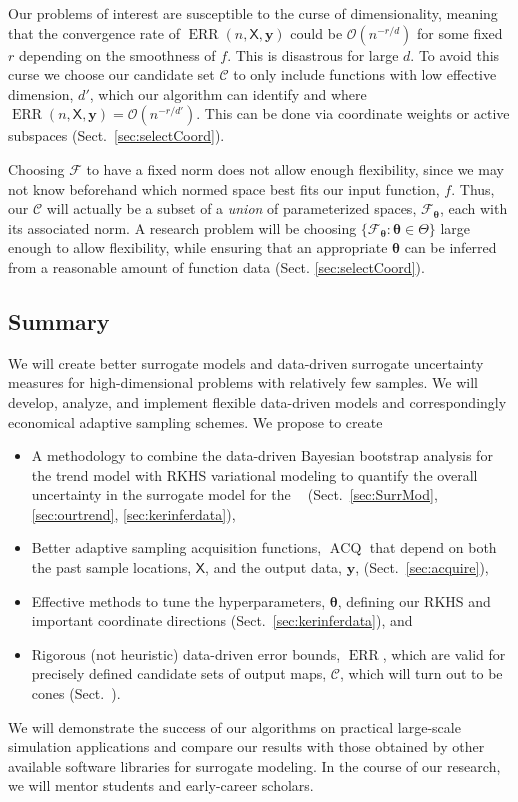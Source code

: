 \documentclass[11pt]{NSFamsart}
\DeclareMathOperator{\QOI}{QOI} %
\DeclareMathOperator{\APP}{\widehat{\QOI}}
\DeclareMathOperator{\ERR}{ERR}
\DeclareMathOperator{\VAL}{ACQ}
\newcommand{\mX}{\mathsf{X}}
\newcommand{\by}{{\boldsymbol{y}}}
\newcommand{\btheta}{{\boldsymbol{\theta}}}
\newcommand{\calc}{{\mathcal{C}}}
\newcommand{\calf}{{\mathcal{F}}}
\newcommand{\Order}{\mathcal{O}}
\begin{document}
Our problems of interest are susceptible to the curse of dimensionality, meaning that the convergence rate of $\ERR(n,\mX,\by)$ could be $\Order(n^{-r/d})$ for some fixed $r$ depending on the smoothness of $f$.  This  is disastrous for large $d$.  To avoid this curse we choose our candidate set $\calc$ to only include functions with low effective dimension, $d'$, which our algorithm can identify and where $\ERR(n,\mX,\by) = \Order(n^{-r/d'})$.  This can be done via coordinate weights or active subspaces (Sect.\ \ref{sec:selectCoord}). 

Choosing  $\calf$ to have a fixed norm does not allow enough flexibility, since we may not know beforehand which normed space best fits our input function, $f$.  Thus, our $\calc$ will actually be a subset of  a \emph{union} of parameterized spaces, $\calf_\btheta$, each with its associated norm.  A research problem will be choosing $\{\calf_\btheta : \btheta \in \Theta\}$ large enough to allow flexibility, while ensuring that an appropriate $\btheta$ can be inferred from a reasonable amount of function data (Sect. \ref{sec:selectCoord}).


\subsection{Summary} 
We will create better surrogate models and data-driven surrogate uncertainty measures for high-dimensional problems with relatively few samples. We will develop, analyze, and implement flexible data-driven models and correspondingly economical adaptive sampling schemes. We propose to create
\begin{itemize}
\item A methodology to combine the data-driven Bayesian bootstrap analysis for the trend model with RKHS variational modeling to quantify the overall uncertainty in the surrogate model for the $\APP$ (Sect.\ \ref{sec:SurrMod}, \ref{sec:ourtrend},  \ref{sec:kerinferdata}),
\item Better adaptive sampling acquisition functions, $\VAL$ that depend on both the past sample locations, $\mX$, and the output data, $\by$, (Sect.\ \ref{sec:acquire}),
\item Effective methods to tune the hyperparameters, $\btheta$, defining our RKHS and important coordinate directions (Sect.\ \ref{sec:kerinferdata}), and
\item Rigorous (not heuristic) data-driven error bounds, $\ERR$, which are valid for precisely defined candidate sets of output maps, $\calc$, which will turn out to be cones (Sect.\ ).
\end{itemize}
We will demonstrate the success of our algorithms on practical large-scale simulation applications and compare our results with those obtained by other available software libraries for surrogate modeling. In the course of our research, we will mentor students and early-career scholars. 
\end{document}
